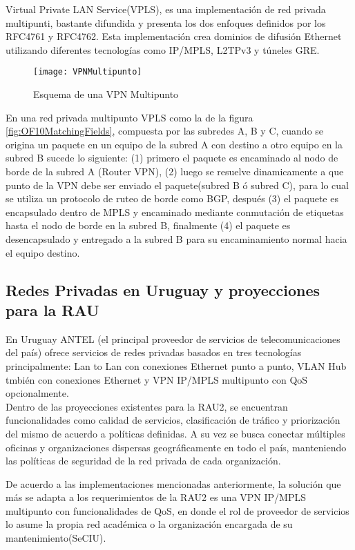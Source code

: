 Virtual Private LAN Service(VPLS), es una implementaci\'on de red privada multipunti, bastante difundida y presenta los dos enfoques definidos por los  RFC4761\citep{kompella2007virtual} y RFC4762\cite{lasserre2007virtual}. Esta implementaci\'on crea dominios de difusión Ethernet utilizando diferentes tecnologías como IP/MPLS, L2TPv3 y túneles GRE.

\begin{figure}[htbp!] 
\centering    
\texttt{[image: VPNMultipunto]}
\caption[Esquema de una VPN Multipunto]{Esquema de una VPN Multipunto}
\label{fig:VPNMulipunto}
\end{figure}
 
En una red privada multipunto VPLS como la de la figura \ref{fig:OF10MatchingFields}, compuesta por las subredes A, B y C, cuando se origina un paquete en un equipo de la subred A con destino a otro equipo en la subred B sucede lo siguiente: (1) primero el paquete es encaminado al nodo de borde de la subred A (Router VPN), (2) luego se resuelve dinamicamente a que punto de la VPN debe ser enviado el paquete(subred B \'o subred C), para lo cual se utiliza un protocolo de ruteo de borde como BGP, despu\'es (3) el paquete es encapsulado dentro de MPLS y encaminado mediante conmutaci\'on de etiquetas hasta el nodo de borde en la subred B, finalmente (4) el paquete es desencapsulado y entregado a la subred B para su encaminamiento normal hacia el equipo destino.

\subsection{Redes Privadas en Uruguay y proyecciones para la RAU}
En Uruguay ANTEL (el principal proveedor de servicios de telecomunicaciones del país) ofrece servicios de redes privadas basados en tres tecnolog\'ias principalmente: Lan to Lan con conexiones Ethernet punto a punto, VLAN Hub tmbi\'en con conexiones Ethernet y VPN IP/MPLS multipunto con QoS opcionalmente.\\

Dentro de las proyecciones existentes para la RAU2, se encuentran funcionalidades como calidad de servicios, clasificaci\'on de tr\'afico y priorizaci\'on del mismo de acuerdo a pol\'iticas definidas. A su vez se busca conectar m\'ultiples oficinas y organizaciones dispersas geogr\'aficamente en todo el país, manteniendo las pol\'iticas de seguridad de la red privada de cada organizaci\'on. 

De acuerdo a las implementaciones mencionadas anteriormente, la soluci\'on que m\'as se adapta a los requerimientos de la RAU2 es una VPN IP/MPLS multipunto con funcionalidades de QoS, en donde el rol de proveedor de servicios lo asume la propia red académica o la organizaci\'on encargada de su mantenimiento(SeCIU).\\ 

